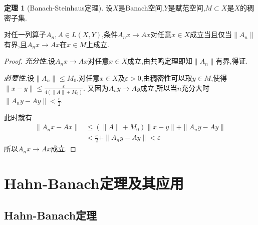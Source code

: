 \documentclass{ctexart}
\theoremstyle{definition}
\newtheorem{theorem}{定理}
\theoremstyle{remark}
\begin{document}
	\begin{theorem}[Banach-Steinhaus定理]
		设$X$是Banach空间,$Y$是赋范空间,$M\subset X$是$X$的稠密子集.
		
		对任一列算子$A_n,A\in L(X,Y)$,条件$A_nx\to Ax$对任意$x\in X$成立当且仅当$\|A_n\|$有界,且$A_nx\to Ax$在$x\in M$上成立.
	\end{theorem}
	\begin{proof}
		\textit{充分性.}设$A_nx\to Ax$对任意$x\in X$成立,由共鸣定理即知$\|A_n\|$有界,得证.
		
		\textit{必要性.}设$\|A_n\|\le M_0$.对任意$x\in X$及$\varepsilon>0$,由稠密性可以取$y\in M$,使得$\|x-y\|\le\frac{\varepsilon}{4(\|A\|+M_0)}$.
		又因为$A_ny\to Ay$成立,所以当$n$充分大时$\|A_ny-Ay\|<\frac{\varepsilon}{2}$.
		
		此时就有
		\begin{align*}
			\|A_nx-Ax\| & \le(\|A\|+M_0)\|x-y\|+\|A_ny-Ay\| \\
			& <\frac{\varepsilon}{2}+\|A_ny-Ay\|<\varepsilon
		\end{align*}
		所以$A_nx\to Ax$成立.
	\end{proof}
	
	\newpage
	
	\section{Hahn-Banach定理及其应用}
	
	\subsection{Hahn-Banach定理}
	
\end{document}
